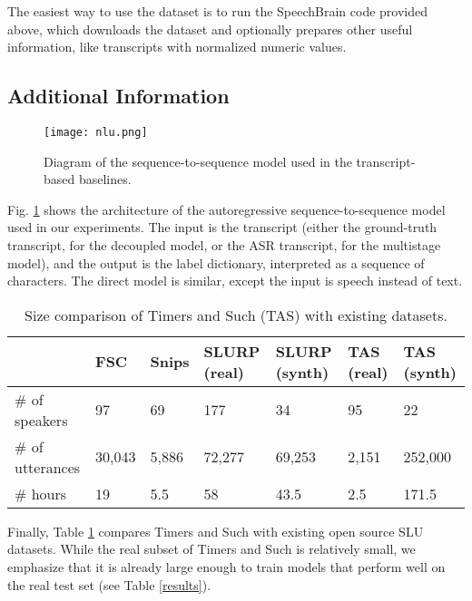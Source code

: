 \documentclass{article}
\begin{document}
The easiest way to use the dataset is to run the SpeechBrain code provided above, which downloads the dataset and optionally prepares other useful information, like transcripts with normalized numeric values.


\subsection{Additional Information}

\begin{figure}[h]
    \centering
    \texttt{[image: nlu.png]}
    \caption{Diagram of the sequence-to-sequence model used in the transcript-based baselines.}
    \label{fig:model_diagram}
\end{figure}

Fig. \ref{fig:model_diagram} shows the architecture of the autoregressive sequence-to-sequence model used in our experiments. The input is the transcript (either the ground-truth transcript, for the decoupled model, or the ASR transcript, for the multistage model), and the output is the label dictionary, interpreted as a sequence of characters. The direct model is similar, except the input is speech instead of text.

\begin{table}[h]
  \caption{Size comparison of Timers and Such (TAS) with existing datasets.}
  \centering
  \begin{tabular}{p{20mm}p{10mm} p{10mm}p{10mm}p{10mm}p{10mm}p{10mm}} \toprule
     & FSC & Snips & SLURP (real) & SLURP (synth) & TAS (real) & TAS (synth) \\
    \midrule
    \# of speakers & 97 & 69  & 177 & 34 & 95 & 22 \\ 
    \# of utterances & 30,043 & 5,886 & 72,277 & 69,253 & 2,151 & 252,000 \\
    \# hours  & 19 & 5.5 & 58 & 43.5 & 2.5 & 171.5  \\
    \bottomrule
  \end{tabular}\label{stats-counts-compare}
  
\end{table}

Finally, Table \ref{stats-counts-compare} compares Timers and Such with existing open source SLU datasets. While the real subset of Timers and Such is relatively small, we emphasize that it is already large enough to train models that perform well on the real test set (see Table \ref{results}).
\end{document}
